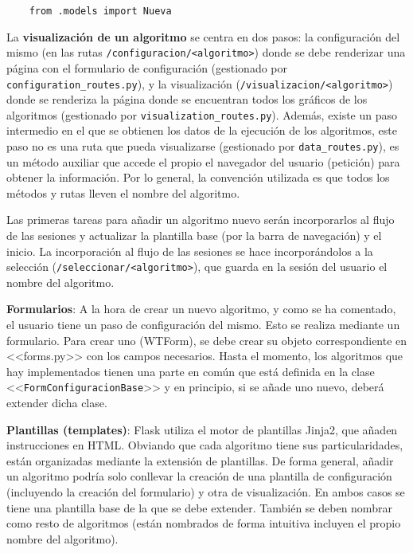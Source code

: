 \begin{tcolorbox}[colback=cyan!5!white,colframe=cyan!75!black,title=Importar modelo (en <<create\_app()>> de \texttt{\_\_init\_\_.py})]
    \begin{verbatim}
    from .models import Nueva
    \end{verbatim}
\end{tcolorbox}

La \textbf{visualización de un algoritmo} se centra en dos pasos: la
configuración del mismo (en las rutas \texttt{/configuracion/<algoritmo>}) donde
se debe renderizar una página con el formulario de configuración (gestionado por
\texttt{configuration\_routes.py}), y la visualización
(\texttt{/visualizacion/<algoritmo>}) donde se renderiza la página donde se
encuentran todos los gráficos de los algoritmos (gestionado por
\texttt{visualization\_routes.py}). Además, existe un paso intermedio en el que
se obtienen los datos de la ejecución de los algoritmos, este paso no es una
ruta que pueda visualizarse (gestionado por \texttt{data\_routes.py}), es un
método auxiliar que accede el propio el navegador del usuario (petición) para
obtener la información. Por lo general, la convención utilizada es que todos los
métodos y rutas lleven el nombre del algoritmo.

Las primeras tareas para añadir un algoritmo nuevo serán incorporarlos al flujo
de las sesiones y actualizar la plantilla base (por la barra de navegación) y el
inicio. La incorporación al flujo de las sesiones se hace incorporándolos a la
selección (\texttt{/seleccionar/<algoritmo>}), que guarda en la sesión del
usuario el nombre del algoritmo.

\textbf{Formularios}: A la hora de crear un nuevo algoritmo, y como se ha
comentado, el usuario tiene un paso de configuración del mismo. Esto se realiza
mediante un formulario. Para crear uno (WTForm), se debe crear su objeto
correspondiente en <<forms.py>> con los campos necesarios. Hasta el momento, los
algoritmos que hay implementados tienen una parte en común que está definida en
la clase <<\texttt{FormConfiguracionBase}>> y en principio, si se añade uno
nuevo, deberá extender dicha clase.

\textbf{Plantillas (templates)}: Flask utiliza el motor de plantillas Jinja2,
que añaden instrucciones en HTML. Obviando que cada algoritmo tiene sus
particularidades, están organizadas mediante la extensión de plantillas. De
forma general, añadir un algoritmo podría solo conllevar la creación de una
plantilla de configuración (incluyendo la creación del formulario) y otra de
visualización. En ambos casos se tiene una plantilla base de la que se debe
extender. También se deben nombrar como resto de algoritmos (están nombrados de
forma intuitiva incluyen el propio nombre del algoritmo).

